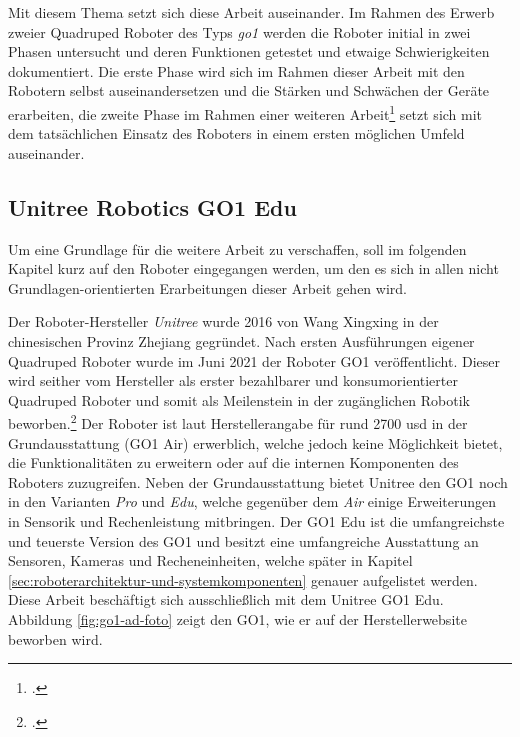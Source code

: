 Mit diesem Thema setzt sich diese Arbeit auseinander.
Im Rahmen des Erwerb zweier Quadruped Roboter des Typs \emph{\gls{go1}} werden die Roboter initial in zwei Phasen
untersucht und deren Funktionen getestet und etwaige Schwierigkeiten dokumentiert.
Die erste Phase wird sich im Rahmen dieser Arbeit mit den Robotern selbst auseinandersetzen und die Stärken und Schwächen der Geräte erarbeiten,
die zweite Phase im Rahmen einer weiteren Arbeit\footcite{jonas} setzt sich mit dem tatsächlichen Einsatz des Roboters
in einem ersten möglichen Umfeld auseinander.

\subsection{Unitree Robotics GO1 Edu}
\label{subsec:unitree-robotics-go1-edu}

Um eine Grundlage für die weitere Arbeit zu verschaffen, soll im folgenden Kapitel kurz auf den Roboter eingegangen werden,
um den es sich in allen nicht Grundlagen-orientierten Erarbeitungen dieser Arbeit gehen wird.

Der Roboter-Hersteller \emph{Unitree} wurde \num{2016} von Wang Xingxing in der chinesischen Provinz Zhejiang gegründet.
Nach ersten Ausführungen eigener Quadruped Roboter wurde im Juni \num{2021} der Roboter GO1 veröffentlicht.
Dieser wird seither vom Hersteller als erster bezahlbarer und konsumorientierter Quadruped Roboter und somit als
Meilenstein in der zugänglichen Robotik beworben.\footcite{unitree-about}
Der Roboter ist laut Herstellerangabe für rund \num{2700} \gls{usd} in der Grundausstattung (GO1 Air) erwerblich, welche jedoch
keine Möglichkeit bietet, die Funktionalitäten zu erweitern oder auf die internen Komponenten des Roboters zuzugreifen.
Neben der Grundausstattung bietet Unitree den GO1 noch in den Varianten \emph{Pro} und \emph{Edu}, welche gegenüber
dem \emph{Air} einige Erweiterungen in Sensorik und Rechenleistung mitbringen.
Der GO1 Edu ist die umfangreichste und teuerste Version des GO1 und besitzt eine umfangreiche Ausstattung an Sensoren,
Kameras und Recheneinheiten, welche später in Kapitel \ref{sec:roboterarchitektur-und-systemkomponenten} genauer aufgelistet
werden.
Diese Arbeit beschäftigt sich ausschließlich mit dem Unitree GO1 Edu.
Abbildung \ref{fig:go1-ad-foto} zeigt den GO1, wie er auf der Herstellerwebsite beworben wird.

